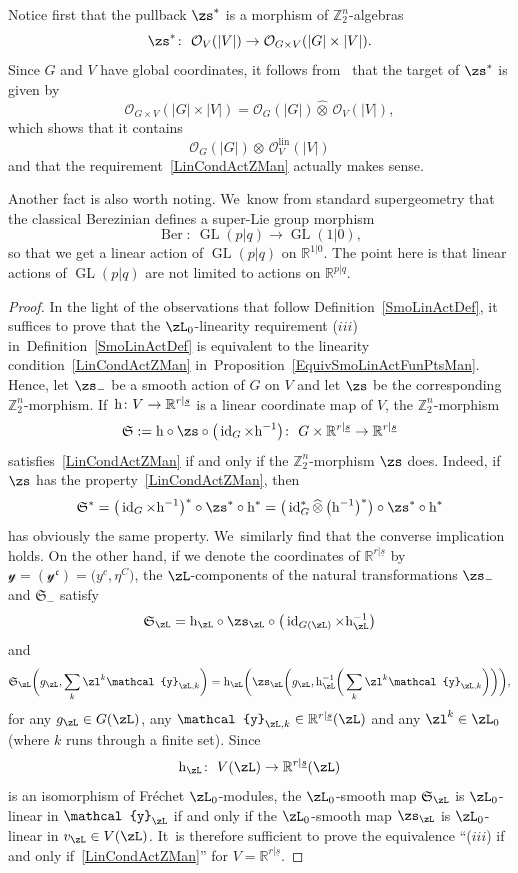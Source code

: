 \documentclass[pdftex]{sigma}%
\newcommand{\rmh}{\textnormal{h}}
\newcommand{\op}[1]{\operatorname{#1}}
\newcommand{\R}{{\mathbb R}}
\newcommand{\Z}{{\mathbb Z}}
\def\ul{\underline}
\def\cO{\mathcal{O}}
\def\ul{\underline}
\newcommand{\0}{\otimes}
\newcommand{\id}{\op{id}}
\newcommand{\z}{\Z_2^n}
\numberwithin{equation}{section}
\begin{document}
Notice first that the pullback $\zs^*$ is a morphism of $\z$-algebras
\[
\zs^*\colon\ \cO_V(|V|)\to\cO_{G\times V}(|G|\times|V|).
\]
Since $G$ and $V$ have global coordinates, it follows from~\cite{Bruce:2019} that the target of $\zs^*$ is given by
\[
\cO_{G\times V}(|G|\times|V|)=\cO_G(|G|)\widehat{\otimes}\,\cO_V(|V|),
\]
which shows that it contains
\[
\cO_G(|G|)\0\,\cO_V^{\op{lin}}(|V|)
\]
and that the requirement~\eqref{LinCondActZMan} actually makes sense.

Another fact is also worth noting. We~know from standard supergeometry that the classical Berezinian defines a super-Lie group morphism
\[
\op{Ber}\colon\ \op{GL}(p|q)\to\op{GL}(1|0),
\]
so that we get a linear action of $\op{GL}(p|q)$ on $\R^{1|0}$. The point here is that linear actions of $\op{GL}(p|q)$ are not limited to actions on $\R^{p|q}$.
\begin{proof}
In the light of the observations that follow Definition~\ref{SmoLinActDef}, it suffices to prove that the $\zL_0$-linearity requirement ($iii$) in~Definition~\ref{SmoLinActDef} is equivalent to the linearity condition~\eqref{LinCondActZMan} in~Proposition~\ref{EquivSmoLinActFunPtsMan}. Hence, let $\zs_-$ be a smooth action of $G$ on $V$ and let $\zs$ be the corresponding $\z$-morphism. If~$\rmh\colon V\to\R^{r|\ul s}$ is a linear coordinate map of $V$, the $\z$-morphism
\[
\mathfrak{S}:=\rmh\circ\zs\circ\big(\id_G\times\rmh^{-1}\big)\colon\ G\times\R^{r|\ul s}\to \R^{r|\ul s}
\]
satisfies~\eqref{LinCondActZMan} if and only if the $\z$-morphism $\zs$ does. Indeed, if $\zs$ has the property~\eqref{LinCondActZMan}, then
\[
\mathfrak{S}^*=\big(\id_G\times\rmh^{-1}\big)^*\circ\zs^*\circ\rmh^* =\big(\id_G^*\widehat{\0}\,\big(\rmh^{-1}\big)^*\big)\circ\zs^*\circ\rmh^*
\]
has obviously the same property. We~similarly find that the converse implication holds. On the other hand, if we denote the coordinates of $\R^{r|\ul s}$ by $\mathcal{y}=(\mathcal{y}^{\mathfrak{c}})=\big(y^c,\eta^C\big)$, the $\zL$-components of the natural transformations $\zs_-$ and $\mathfrak{S}_-$ satisfy
\[
\mathfrak{S}_\zL=\rmh_\zL\circ\zs_\zL\circ\big(\id_{G(\zL)}\times\rmh_\zL^{-1}\big)
\]
and
\[
\mathfrak{S}_\zL\bigg(g_\zL,\sum_k\zl^k\mathcal{y}_{\zL,k}\bigg) =\rmh_\zL\bigg(\zs_\zL\bigg(g_\zL,\rmh_\zL^{-1}\bigg(\sum_k\zl^k\mathcal{y}_{\zL,k}\bigg)\bigg)\bigg),
\]
for any $g_\zL\in G(\zL)$, any $\mathcal{y}_{\zL,k}\in\R^{r|\ul s}(\zL)$ and any $\zl^k\in\zL_0$ (where $k$ runs through a finite set). Since
\[
\rmh_\zL\colon\ V(\zL)\to\R^{r|\ul s}(\zL)
\]
is an isomorphism of Fr\'echet $\zL_0$-modules, the $\zL_0$-smooth map $\mathfrak{S}_\zL$ is $\zL_0$-linear in $\mathcal{y}_\zL$ if and only if the $\zL_0$-smooth map $\zs_\zL$ is $\zL_0$-linear in $v_\zL\in V(\zL)$. It~is therefore sufficient to prove the equivalence ``($iii$) if and only if~\eqref{LinCondActZMan}'' for $V=\R^{r|\ul s}$.


\end{proof}
\end{document}
